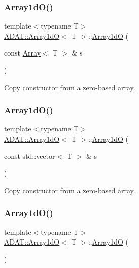 \subsubsection{\texorpdfstring{Array1dO()}{Array1dO()}\hspace{0.1cm}{\footnotesize\ttfamily [4/15]}}
{\footnotesize\ttfamily template$<$typename T$>$ \\
\mbox{\hyperlink{classADAT_1_1Array1dO}{A\+D\+A\+T\+::\+Array1dO}}$<$ T $>$\+::\mbox{\hyperlink{classADAT_1_1Array1dO}{Array1dO}} (\begin{DoxyParamCaption}\item[{const \mbox{\hyperlink{classXMLArray_1_1Array}{Array}}$<$ T $>$ \&}]{s }\end{DoxyParamCaption})\hspace{0.3cm}{\ttfamily [inline]}}



Copy constructor from a zero-\/based array. 

\mbox{\label{classADAT_1_1Array1dO_aad6c2df87d1dc941fd561fd74d181ddc}} 
\subsubsection{\texorpdfstring{Array1dO()}{Array1dO()}\hspace{0.1cm}{\footnotesize\ttfamily [5/15]}}
{\footnotesize\ttfamily template$<$typename T$>$ \\
\mbox{\hyperlink{classADAT_1_1Array1dO}{A\+D\+A\+T\+::\+Array1dO}}$<$ T $>$\+::\mbox{\hyperlink{classADAT_1_1Array1dO}{Array1dO}} (\begin{DoxyParamCaption}\item[{const std\+::vector$<$ T $>$ \&}]{s }\end{DoxyParamCaption})\hspace{0.3cm}{\ttfamily [inline]}}



Copy constructor from a zero-\/based array. 

\mbox{\label{classADAT_1_1Array1dO_af55d30db029bb654a123544dfc155e6a}} 
\subsubsection{\texorpdfstring{Array1dO()}{Array1dO()}\hspace{0.1cm}{\footnotesize\ttfamily [6/15]}}
{\footnotesize\ttfamily template$<$typename T$>$ \\
\mbox{\hyperlink{classADAT_1_1Array1dO}{A\+D\+A\+T\+::\+Array1dO}}$<$ T $>$\+::\mbox{\hyperlink{classADAT_1_1Array1dO}{Array1dO}} (\begin{DoxyParamCaption}{ }\end{DoxyParamCaption})\hspace{0.3cm}{\ttfamily [inline]}}

